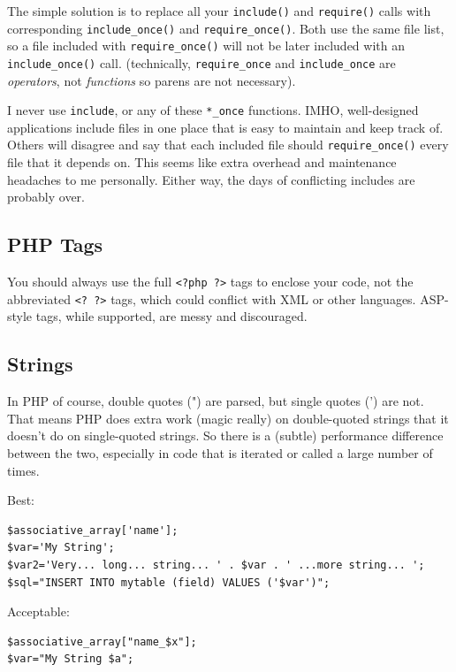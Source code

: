 \documentclass[headexclude,footexclude,12pt,BCOR0pt,DIV15]{scrartcl}
\begin{document}
        The simple solution is to replace all your \texttt{include()} and \texttt{require()} calls with corresponding
        \texttt{include\_once()} and \texttt{require\_once()}. Both use the same file list, so a file included with
        \texttt{require\_once()} will not be later included with an \texttt{include\_once()} call. (technically,
        \texttt{require\_once} and \texttt{include\_once} are \emph{operators}, not \emph{functions} so parens are not necessary).

        I never use \texttt{include}, or any of these \texttt{*\_once} functions. IMHO, well-designed applications include
        files in one place that is easy to maintain and keep track of. Others will disagree and say that each included file
        should \texttt{require\_once()} every file that it depends on. This seems like extra overhead and maintenance headaches
        to me personally. Either way, the days of conflicting includes are probably over.

    \subsection{PHP Tags}
        You should always use the full \texttt{<?php ?>} tags to enclose your code, not the abbreviated \texttt{<? ?>} tags,
        which could conflict with XML or other languages. ASP-style tags, while supported, are messy and discouraged.

    \subsection{Strings}
        In PHP of course, double quotes (") are parsed, but single quotes (') are not. That means PHP does extra work
        (magic really) on double-quoted strings that it doesn't do on single-quoted strings. So there is a (subtle)
        performance difference between the two, especially in code that is iterated or called a large number of times.
        \begin{description}
            \item{Best:}
\begin{lstlisting}[stepnumber=0,frame={}]
$associative_array['name'];
$var='My String';
$var2='Very... long... string... ' . $var . ' ...more string... ';
$sql="INSERT INTO mytable (field) VALUES ('$var')";
\end{lstlisting}
            \item{Acceptable:}
\begin{lstlisting}[stepnumber=0,frame={}]
$associative_array["name_$x"];
$var="My String $a";
\end{lstlisting}
        \end{description}
\end{document}
